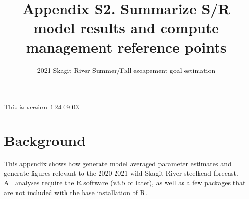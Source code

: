 \documentclass[
  11pt,
]{article}
\title{Appendix S2. Summarize S/R model results and compute management
reference points}
\subtitle{2021 Skagit River Summer/Fall escapement goal estimation}
\author{}
\date{\vspace{-2.5em}}
\begin{document}
\maketitle

{
\setcounter{tocdepth}{3}
\tableofcontents
}
\vspace{0.2in}

This is version 0.24.09.03.

\hypertarget{background}{%
\section{Background}\label{background}}

This appendix shows how generate model averaged parameter estimates and
generate figures relevant to the 2020-2021 wild Skagit River steelhead
forecast. All analyses require the \href{https://cran.r-project.org/}{R
software} (v3.5 or later), as well as a few packages that are not
included with the base installation of R.
\end{document}
